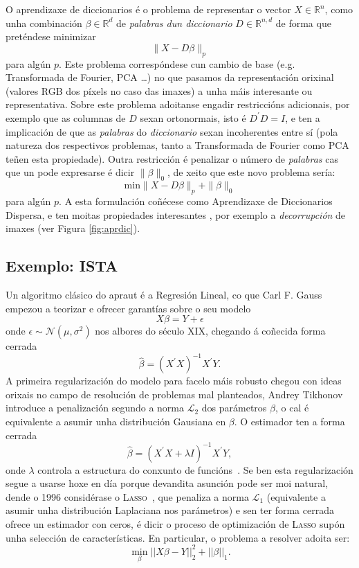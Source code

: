O aprendizaxe de diccionarios é o problema de representar o vector $X \in \mathbb{R}^n$, como unha combinación $\beta \in \mathbb{R}^d$ de \emph{palabras dun diccionario} $D\in\mathbb{R}^{n,d}$ de forma que preténdese minimizar \[\|X - D\beta\|_p\] para algún $p$. Este problema correspóndese cun cambio de base (e.g. Transformada de Fourier, PCA \dots) no que pasamos da representación orixinal (valores RGB dos \glspl{píxel} no caso das imaxes) a unha máis interesante ou representativa. Sobre este problema adoitanse engadir restriccións adicionais, por exemplo que as columnas de $D$ sexan ortonormais, isto é $D^{'}D=I$, e ten a implicación de que as \emph{palabras} do \emph{diccionario} sexan incoherentes entre sí (pola natureza dos respectivos problemas, tanto a Transformada de Fourier como PCA teñen esta propiedade). Outra restricción é penalizar o número de \emph{palabras} cas que un pode expresarse é dicir $\|\beta\|_0$, de xeito que este novo problema sería: \[\text{min} \|X-D\beta\|_p + \|\beta\|_0 \] para algún $p$. A esta formulación coñécese como \textcolor{udcpink}{Aprendizaxe de Diccionarios Dispersa}, e ten moitas propiedades interesantes \cite{Wright_2022}, por exemplo a \emph{decorrupción} de imaxes (ver Figura \ref{fig:aprdic}).



\subsection{Exemplo: ISTA}
\label{sec:ista}

Un algoritmo clásico do \acrshort{apraut} é a Regresión Lineal, co que Carl F. Gauss empezou a teorizar e ofrecer garantías sobre o seu modelo \[X\beta = Y + \epsilon\] onde $\epsilon \sim \mathcal{N}(\mu, \sigma^2)$ nos albores do século XIX, chegando á coñecida forma cerrada \[\hat\beta = (X^{'}X)^{-1}X^{'}Y.\] A primeira regularización do modelo para facelo máis robusto chegou con ideas orixais no campo de resolución de problemas mal planteados, Andrey Tikhonov introduce a penalización segundo a norma $\mathcal{L}_2$ dos parámetros $\beta$, o cal é equivalente a asumir unha distribución Gausiana en $\beta$. O estimador ten a forma cerrada \[\hat\beta = (X^{'}X +\lambda I)^{-1}X^{'}Y,\]  onde $\lambda$ controla a estructura do conxunto de funcións~\cite{vapnik95}. Se ben esta regularización segue a usarse hoxe en día porque devandita asunción pode ser moi natural, dende o 1996 considérase o \textsc{Lasso}~\cite{lasso}, que penaliza a norma $\mathcal{L}_1$ (equivalente a asumir unha distribución Laplaciana nos parámetros) e sen ter forma cerrada ofrece un estimador con ceros, é dicir o proceso de optimización de \textsc{Lasso} supón unha selección de características. En particular, o problema a resolver adoita ser:
\[\min_{\beta} ||X\beta -Y||_2^2 + ||\beta||_1. \tag{1}\label{eq:objetivolasso} \]


